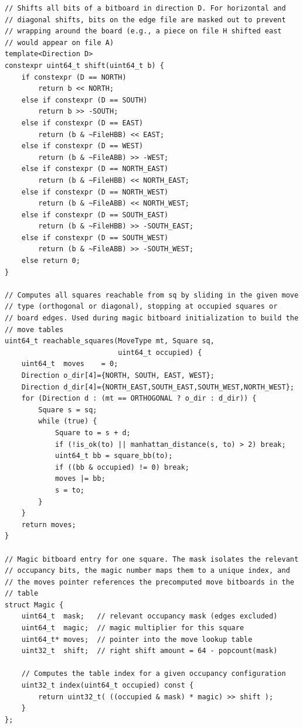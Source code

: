 \documentclass[12pt,a4paper,twoside,openright]{book}
\begin{document}
\begin{mdframed}[skipabove=\baselineskip,topline=false,rightline=false,bottomline=false,leftline=false,linewidth=1pt,linecolor=gray!40,innerleftmargin=8pt]
\begin{verbatim}
// Shifts all bits of a bitboard in direction D. For horizontal and
// diagonal shifts, bits on the edge file are masked out to prevent 
// wrapping around the board (e.g., a piece on file H shifted east 
// would appear on file A)
template<Direction D>
constexpr uint64_t shift(uint64_t b) {
    if constexpr (D == NORTH)
        return b << NORTH;
    else if constexpr (D == SOUTH)
        return b >> -SOUTH;
    else if constexpr (D == EAST)
        return (b & ~FileHBB) << EAST;
    else if constexpr (D == WEST)
        return (b & ~FileABB) >> -WEST;
    else if constexpr (D == NORTH_EAST)
        return (b & ~FileHBB) << NORTH_EAST;
    else if constexpr (D == NORTH_WEST)
        return (b & ~FileABB) << NORTH_WEST;
    else if constexpr (D == SOUTH_EAST)
        return (b & ~FileHBB) >> -SOUTH_EAST;
    else if constexpr (D == SOUTH_WEST)
        return (b & ~FileABB) >> -SOUTH_WEST;
    else return 0;
}

// Computes all squares reachable from sq by sliding in the given move 
// type (orthogonal or diagonal), stopping at occupied squares or
// board edges. Used during magic bitboard initialization to build the 
// move tables
uint64_t reachable_squares(MoveType mt, Square sq, 
                           uint64_t occupied) {
    uint64_t  moves    = 0;
    Direction o_dir[4]={NORTH, SOUTH, EAST, WEST};
    Direction d_dir[4]={NORTH_EAST,SOUTH_EAST,SOUTH_WEST,NORTH_WEST};
    for (Direction d : (mt == ORTHOGONAL ? o_dir : d_dir)) {
        Square s = sq;
        while (true) {
            Square to = s + d;
            if (!is_ok(to) || manhattan_distance(s, to) > 2) break;
            uint64_t bb = square_bb(to);
            if ((bb & occupied) != 0) break;
            moves |= bb;
            s = to;
        }
    }
    return moves;
}

// Magic bitboard entry for one square. The mask isolates the relevant
// occupancy bits, the magic number maps them to a unique index, and 
// the moves pointer references the precomputed move bitboards in the 
// table
struct Magic {
    uint64_t  mask;   // relevant occupancy mask (edges excluded)
    uint64_t  magic;  // magic multiplier for this square
    uint64_t* moves;  // pointer into the move lookup table
    uint32_t  shift;  // right shift amount = 64 - popcount(mask)

    // Computes the table index for a given occupancy configuration
    uint32_t index(uint64_t occupied) const {
        return uint32_t( ((occupied & mask) * magic) >> shift );
    }
};


\end{verbatim}
\end{mdframed}
\end{document}
